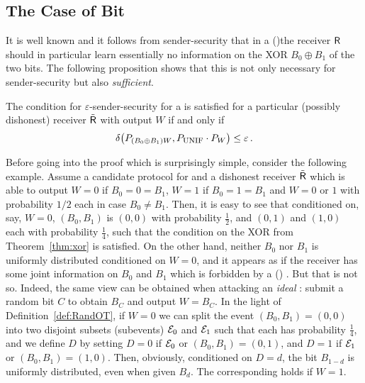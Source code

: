 \subsection{The Case of Bit \pOT}

It is well known and it follows from sender-security that in a
(\Rand)\:\OT the receiver ${\sf R}$ should in particular learn essentially
no information on the XOR $B_0 \oplus B_1$ of the two bits. The
following proposition shows that this is not only necessary for
sender-security but also {\em sufficient}.
\begin{theorem}\label{thm:xor}
  The condition for $\varepsilon$-sender-security for a \RandOT is
  satisfied for a particular (possibly dishonest) receiver $\tilde{\sf R}$ with
  output $W$ if and only if
$$
\delta\big( P_{(B_0 \oplus B_1) W} , P_{\mbox{\sc unif}} \cdot P_{W} \big) \leq \varepsilon
\, .
$$
\end{theorem}

Before going into the proof which is surprisingly simple, consider
the following example. Assume a candidate protocol for \RandOT and a
dishonest receiver $\tilde{\sf R}$ which is able to output $W = 0$ if $B_0 = 0 =
B_1$, $W = 1$ if $B_0 = 1 = B_1$ and $W = 0$ or $1$ with probability
$1/2$ each in case $B_0 \neq B_1$. Then, it is easy to see that
conditioned on, say, $W = 0$, $(B_0,B_1)$ is $(0,0)$ with probability
$\frac12$, and $(0,1)$ and $(1,0)$ each with probability $\frac14$,
such that the condition on the XOR from Theorem~\ref{thm:xor} is
satisfied. On the other hand, neither $B_0$ nor $B_1$ is uniformly distributed conditioned on $W = 0$, and 
it appears as if the receiver has some
joint information on $B_0$ and $B_1$ which is forbidden by a (\Rand)
\OT. But that is not so. Indeed, the same view can be obtained when
attacking an {\em ideal} \RandOT: submit a random bit $C$ to obtain $B_{C}$
and output $W = B_{C}$. In the light of Definition~\ref{def:RandOT},
if $W = 0$ we can split the event $(B_0,B_1) = (0,0)$ into two
disjoint subsets (subevents) ${\cal E}_0$ and ${\cal E}_1$ such that
each has probability $\frac14$, and we define $D$ by setting $D =
0$ if ${\cal E}_0$ or $(B_0,B_1) = (0,1)$, and $D = 1$ if ${\cal E}_1$
or $(B_0,B_1) = (1,0)$. Then, obviously, conditioned on $D = d$, the
bit $B_{1-d}$ is uniformly distributed, even when given $B_d$. The
corresponding holds if $W = 1$.


